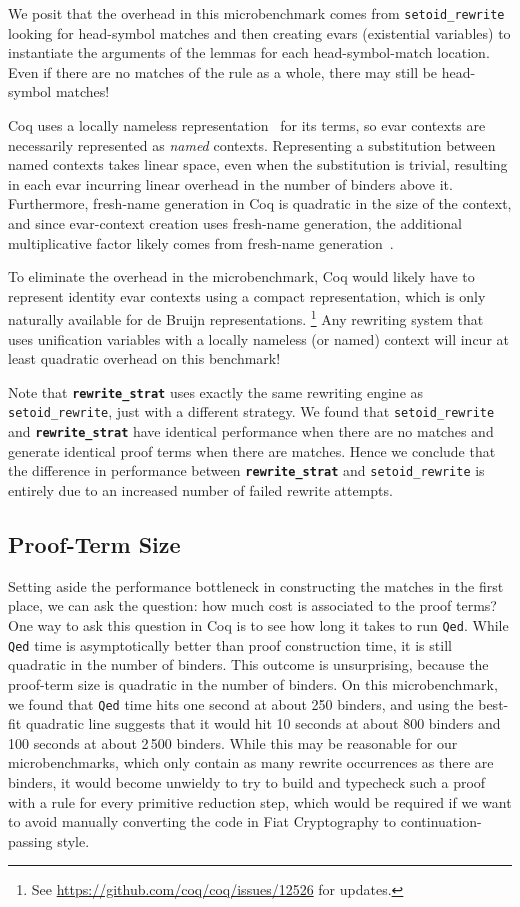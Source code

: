 \documentclass[sn-mathphys,pdflatex]{sn-jnl}%
\makeatletter
\renewcommand{\todo}[2][]{\tikzexternaldisable\@todo[#1]{#2}\tikzexternalenable}
\let\@badhref=\href
\renewcommand{\href}[2]{\@badhref{#2}{#1}}
\newcommand{\coqbug}[2][Coq bug~]{\href{https://github.com/coq/coq/issues/#2}{#1\##2}}
\newcommand{\tacsetoidrewrite}{\texttt{setoid_rewrite}}
\newcommand{\tacrewritestrat}{\textbf{\texttt{rewrite\_strat}}}
\theoremstyle{thmstyleone}%
\theoremstyle{thmstyletwo}%
\theoremstyle{thmstylethree}%
\makeatother
\begin{document}
We posit that the overhead in this microbenchmark comes from \tacsetoidrewrite{} looking for head-symbol matches and then creating evars (existential variables) to instantiate the arguments of the lemmas for each head-symbol-match location.
Even if there are no matches of the rule as a whole, there may still be head-symbol matches!

Coq uses a locally nameless representation~\cite{LocallyNameless} for its terms, so evar contexts are necessarily represented as \emph{named} contexts.
Representing a substitution between named contexts takes linear space, even when the substitution is trivial, resulting in each evar incurring linear overhead in the number of binders above it.
Furthermore, fresh-name generation in Coq is quadratic in the size of the context, and since evar-context creation uses fresh-name generation, the additional multiplicative factor likely comes from fresh-name generation~\cite{coqbug-12524}.

To eliminate the overhead in the microbenchmark, Coq would likely have to represent identity evar contexts using a compact representation, which is only naturally available for de Bruijn representations.%
\footnote{%
See \coqbug{12526} for updates.%
}
Any rewriting system that uses unification variables with a locally nameless (or named) context will incur at least quadratic overhead on this benchmark!

Note that \tacrewritestrat{} uses exactly the same rewriting engine as \tacsetoidrewrite{}, just with a different strategy.
We found that \tacsetoidrewrite{} and \tacrewritestrat{} have identical performance when there are no matches and generate identical proof terms when there are matches.
Hence we conclude that the difference in performance between \tacrewritestrat{} and \tacsetoidrewrite{} is entirely due to an increased number of failed rewrite attempts.

\subsection{Proof-Term Size}

Setting aside the performance bottleneck in constructing the matches in the first place, we can ask the question: how much cost is associated to the proof terms?
One way to ask this question in Coq is to see how long it takes to run \texttt{Qed}.
While \texttt{Qed} time is asymptotically better than proof construction time, it is still quadratic in the number of binders.
This outcome is unsurprising, because the proof-term size is quadratic in the number of binders.
On this microbenchmark, we found that \texttt{Qed} time hits one second at about 250 binders, and using the best-fit quadratic line suggests that it would hit 10 seconds at about 800 binders and 100 seconds at about 2\,500 binders.
While this may be reasonable for our microbenchmarks, which only contain as many rewrite occurrences as there are binders, it would become unwieldy to try to build and typecheck such a proof with a rule for every primitive reduction step, which would be required if we want to avoid manually converting the code in Fiat Cryptography to continuation-passing style.
\end{document}
